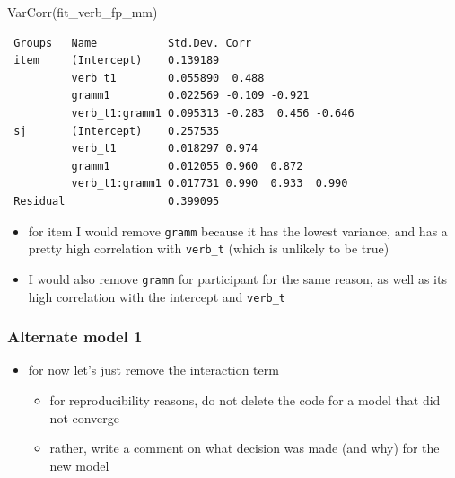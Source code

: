 \documentclass[
  letterpaper,
  DIV=11,
  numbers=noendperiod]{scrartcl}
\newenvironment{Shaded}{\begin{snugshade}}{\end{snugshade}}
\newcommand{\FunctionTok}[1]{\textcolor[rgb]{0.28,0.35,0.67}{#1}}
\newcommand{\NormalTok}[1]{\textcolor[rgb]{0.00,0.23,0.31}{#1}}
\providecommand{\tightlist}{%
  \setlength{\itemsep}{0pt}\setlength{\parskip}{0pt}}\usepackage{longtable,booktabs,array}
\begin{document}
\begin{Shaded}
\begin{Highlighting}[]
\FunctionTok{VarCorr}\NormalTok{(fit\_verb\_fp\_mm)}
\end{Highlighting}
\end{Shaded}

\begin{verbatim}
 Groups   Name           Std.Dev. Corr                
 item     (Intercept)    0.139189                     
          verb_t1        0.055890  0.488              
          gramm1         0.022569 -0.109 -0.921       
          verb_t1:gramm1 0.095313 -0.283  0.456 -0.646
 sj       (Intercept)    0.257535                     
          verb_t1        0.018297 0.974               
          gramm1         0.012055 0.960  0.872        
          verb_t1:gramm1 0.017731 0.990  0.933  0.990 
 Residual                0.399095                     
\end{verbatim}

\begin{itemize}
\tightlist
\item
  for item I would remove \texttt{gramm} because it has the lowest
  variance, and has a pretty high correlation with \texttt{verb\_t}
  (which is unlikely to be true)
\item
  I would also remove \texttt{gramm} for participant for the same
  reason, as well as its high correlation with the intercept and
  \texttt{verb\_t}
\end{itemize}

\hypertarget{alternate-model-1}{%
\subsubsection{Alternate model 1}\label{alternate-model-1}}

\begin{itemize}
\tightlist
\item
  for now let's just remove the interaction term

  \begin{itemize}
  \tightlist
  \item
    for reproducibility reasons, do not delete the code for a model that
    did not converge
  \item
    rather, write a comment on what decision was made (and why) for the
    new model
  \end{itemize}
\end{itemize}
\end{document}
